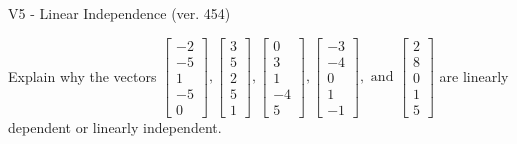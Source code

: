 \begin{exercise}
  \begin{exerciseTitle}V5 - Linear Independence (ver. 454)\end{exerciseTitle}
  \begin{exerciseStatement}
    Explain why the vectors \(\left[\begin{array}{r}
-2 \\
-5 \\
1 \\
-5 \\
0
\end{array}\right] , \left[\begin{array}{r}
3 \\
5 \\
2 \\
5 \\
1
\end{array}\right] , \left[\begin{array}{r}
0 \\
3 \\
1 \\
-4 \\
5
\end{array}\right] , \left[\begin{array}{r}
-3 \\
-4 \\
0 \\
1 \\
-1
\end{array}\right] , \text{ and } \left[\begin{array}{r}
2 \\
8 \\
0 \\
1 \\
5
\end{array}\right]\) are linearly dependent or linearly independent.	



\end{exerciseStatement}
\end{exercise}

